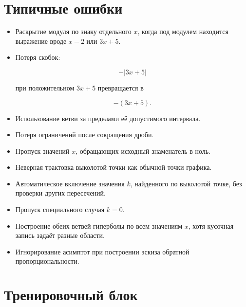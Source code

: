 \documentclass[a4paper,12pt]{article}
\begin{document}

\section{Типичные ошибки}

\begin{itemize}

\item Раскрытие модуля по знаку отдельного \(x\), когда под модулем находится выражение вроде \(x-2\) или \(3x+5\).

\item Потеря скобок:

\[
-|3x+5|
\]

при положительном \(3x+5\) превращается в

\[
-(3x+5).
\]

\item Использование ветви за пределами её допустимого интервала.

\item Потеря ограничений после сокращения дроби.

\item Пропуск значений \(x\), обращающих исходный знаменатель в ноль.

\item Неверная трактовка выколотой точки как обычной точки графика.

\item Автоматическое включение значения \(k\), найденного по выколотой точке, без проверки других пересечений.

\item Пропуск специального случая \(k=0\).

\item Построение обеих ветвей гиперболы по всем значениям \(x\), хотя кусочная запись задаёт разные области.

\item Игнорирование асимптот при построении эскиза обратной пропорциональности.

\end{itemize}

\clearpage
\section*{Тренировочный блок}
\end{document}
